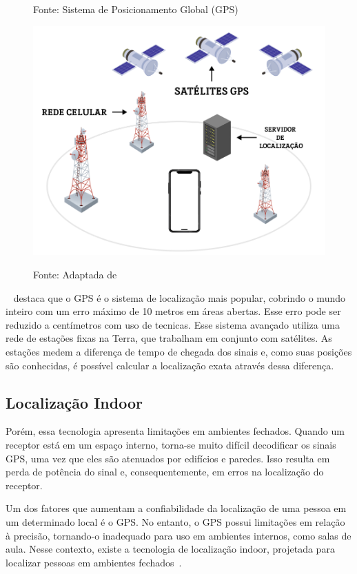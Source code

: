 \begin{figure}[H]
    \centering
    \caption{Fonte: Sistema de Posicionamento Global (GPS)}
    \begin{minipage}{.9\textwidth}
        \centering
        \includegraphics[width=.9\linewidth]{imagens/sistema-gps}
        \label{fig: Sistema de GPS}
    \end{minipage}
    \caption*{Fonte: Adaptada de~\cite{juansyah2015pembangunan}}
\end{figure}

~\cite{moura2007wbls} destaca que o GPS é o sistema de localização mais popular, cobrindo o mundo inteiro com um erro máximo de 10 metros em áreas abertas.
Esse erro pode ser reduzido a centímetros com uso de tecnicas.
Esse sistema avançado utiliza uma rede de estações fixas na Terra, que trabalham em conjunto com satélites.
As estações medem a diferença de tempo de chegada dos sinais e, como suas posições são conhecidas, é possível calcular a localização exata através dessa diferença.

\subsection{Localização Indoor}\label{subsec:localizacao-indoor}

Porém, essa tecnologia apresenta limitações em ambientes fechados.
Quando um receptor está em um espaço interno, torna-se muito difícil decodificar os sinais GPS, uma vez que eles são atenuados por edifícios e paredes.
Isso resulta em perda de potência do sinal e, consequentemente, em erros na localização do receptor.


Um dos fatores que aumentam a confiabilidade da localização de uma pessoa em um determinado local é o GPS. No entanto, o GPS possui limitações em relação à precisão, tornando-o inadequado para uso em ambientes internos, como salas de aula.
Nesse contexto, existe a tecnologia de localização indoor, projetada para localizar pessoas em ambientes fechados~\cite{mittelstadt2018bluepath}.



